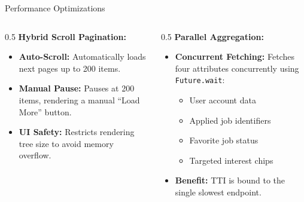 \documentclass[10pt]{beamer}
\begin{document}
\begin{frame}{Performance Optimizations}
    \begin{columns}
        \begin{column}{0.5\textwidth}
            \textbf{Hybrid Scroll Pagination:}
            \begin{itemize}
                \item \textbf{Auto-Scroll:} Automatically loads next pages up to 200 items.
                \item \textbf{Manual Pause:} Pauses at 200 items, rendering a manual ``Load More'' button.
                \item \textbf{UI Safety:} Restricts rendering tree size to avoid memory overflow.
            \end{itemize}
        \end{column}
        \begin{column}{0.5\textwidth}
            \textbf{Parallel Aggregation:}
            \begin{itemize}
                \item \textbf{Concurrent Fetching:} Fetches four attributes concurrently using \texttt{Future.wait}:
                \begin{itemize}
                    \item User account data
                    \item Applied job identifiers
                    \item Favorite job status
                    \item Targeted interest chips
                \end{itemize}
                \item \textbf{Benefit:} TTI is bound to the single slowest endpoint.
            \end{itemize}
        \end{column}
    \end{columns}
\end{frame}
\end{document}
